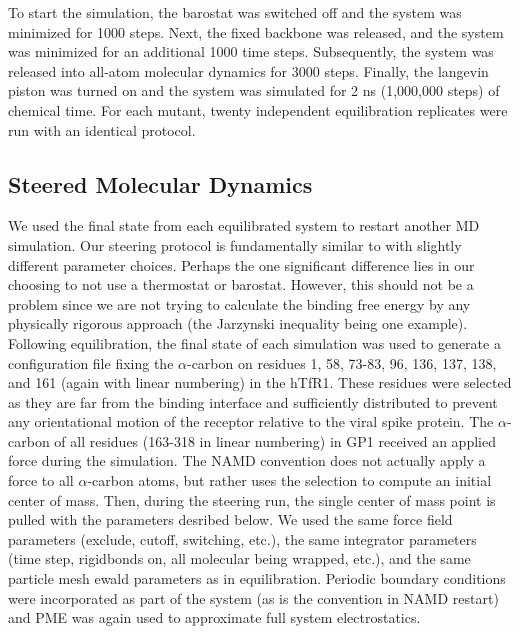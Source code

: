 \documentclass[12pt]{article}
\begin{document}
To start the simulation, the barostat was switched off and the system was minimized for 1000 steps. Next, the fixed backbone was released, and the system was minimized for an additional 1000 time steps. Subsequently, the system was released into all-atom molecular dynamics for 3000 steps. Finally, the langevin piston was turned on and the system was simulated for 2 ns (1,000,000 steps) of chemical time. For each mutant, twenty independent equilibration replicates were run with an identical protocol.

\subsection{Steered Molecular Dynamics}

We used the final state from each equilibrated system to restart another MD simulation. Our steering protocol is fundamentally similar to \citet{Cuendet2008} with slightly different parameter choices. Perhaps the one significant difference lies in our choosing to not use a thermostat or barostat. However, this should not be a problem since we are not trying to calculate the binding free energy by any physically rigorous approach (the Jarzynski inequality being one example). Following equilibration, the final state of each simulation was used to generate a configuration file fixing the $\alpha$-carbon on residues 1, 58, 73-83, 96, 136, 137, 138, and 161 (again with linear numbering) in the hTfR1. These residues were selected as they are far from the binding interface and sufficiently distributed to prevent any orientational motion of the receptor relative to the viral spike protein. The $\alpha$-carbon of all residues (163-318 in linear numbering) in GP1 received an applied force during the simulation. The NAMD convention does not actually apply a force to all $\alpha$-carbon atoms, but rather uses the selection to compute an initial center of mass. Then, during the steering run, the single center of mass point is pulled with the parameters desribed below. We used the same force field parameters (exclude, cutoff, switching, etc.), the same integrator parameters (time step, rigidbonds on, all molecular being wrapped, etc.), and the same particle mesh ewald parameters as in equilibration. Periodic boundary conditions were incorporated as part of the system (as is the convention in NAMD restart) and PME was again used to approximate full system electrostatics. 
\end{document}
